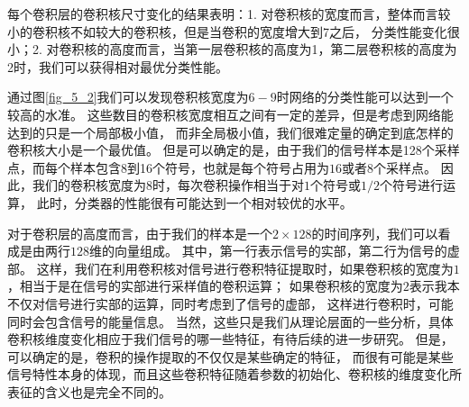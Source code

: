 每个卷积层的卷积核尺寸变化的结果表明：1. 对卷积核的宽度而言，整体而言较小的卷积核不如较大的卷积核，但是当卷积的宽度增大到7之后，
分类性能变化很小；2. 对卷积核的高度而言，当第一层卷积核的高度为1，第二层卷积核的高度为2时，我们可以获得相对最优分类性能。\par


通过图\ref{fig_5_2}我们可以发现卷积核宽度为$6-9$时网络的分类性能可以达到一个较高的水准。
这些数目的卷积核宽度相互之间有一定的差异，但是考虑到网络能达到的只是一个局部极小值，
而非全局极小值，我们很难定量的确定到底怎样的卷积核大小是一个最优值。
但是可以确定的是，由于我们的信号样本是128个采样点，而每个样本包含8到16个符号，也就是每个符号占用为$16$或者$8$个采样点。
因此，我们的卷积核宽度为$8$时，每次卷积操作相当于对$1$个符号或$1/2$个符号进行运算，
此时，分类器的性能很有可能达到一个相对较优的水平。\par


对于卷积层的高度而言，由于我们的样本是一个$2\times128$的时间序列，我们可以看成是由两行$128$维的向量组成。
其中，第一行表示信号的实部，第二行为信号的虚部。
这样，我们在利用卷积核对信号进行卷积特征提取时，如果卷积核的宽度为$1$，相当于是在信号的实部进行采样值的卷积运算；
如果卷积核的宽度为$2$表示我本不仅对信号进行实部的运算，同时考虑到了信号的虚部，
这样进行卷积时，可能同时会包含信号的能量信息。
当然，这些只是我们从理论层面的一些分析，具体卷积核维度变化相应于我们信号的哪一些特征，有待后续的进一步研究。
但是，可以确定的是，卷积的操作提取的不仅仅是某些确定的特征，
而很有可能是某些信号特性本身的体现，而且这些卷积特征随着参数的初始化、卷积核的维度变化所表征的含义也是完全不同的。\par

